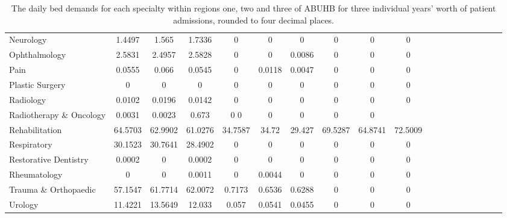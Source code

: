 \documentclass[../thesis.tex]{subfiles}
\begin{document}
\begin{landscape}
\begin{table}[h!]
{\begin{tabular}{lcccccccccccccccccc}
Neurology&1.4497	&1.565	&1.7336&	0&	0	&0&	0	&0	&0	\\
Ophthalmology  &2.5831	&2.4957	&2.5828&	0&	0	&0.0086	&0	&0&	0\\
Pain &0.0555	&0.066	&0.0545&	0&	0.0118	&0.0047	&0&	0	&0\\
Plastic Surgery&0	&0	&0	&0	&0&	0&	0	&0	&0\\
Radiology&0.0102	&0.0196	&0.0142	&0&	0&	0	&0	&0&	0\\
 Radiotherapy \& Oncology&0.0031	&0.0023	&0.673	&0	0	&0	&0	&0	&0\\
Rehabilitation&64.5703&	62.9902	&61.0276	&34.7587&	34.72&	29.427	&69.5287&	64.8741&	72.5009	\\
Respiratory&30.1523	&30.7641&	28.4902&	0	&0	&0	&0	&0	&0\\
Restorative Dentistry&0.0002	&0	&0.0002&	0	&0	&0	&0	&0	&0\\
Rheumatology&0	&0&	0.0011&	0	&0.0044&0	&0	&0	&0\\
Trauma \& Orthopaedic&57.1547	&61.7714&	62.0072&	0.7173	&0.6536&	0.6288&	0&	0	&0\\
Urology&11.4221	&13.5649&	12.033&	0.057	&0.0541&	0.0455&	0&	0	&0\\ \bottomrule

    \end{tabular}}
    \caption{The daily bed demands for each specialty within regions one, two and three of ABUHB for three individual years' worth of patient admissions, rounded to four decimal places.}
    \label{tab:regionaldemandsexp2a}
\end{table}

\begin{table}[h! ]
    \centering{}
\end{table}
\end{landscape}
\end{document}
